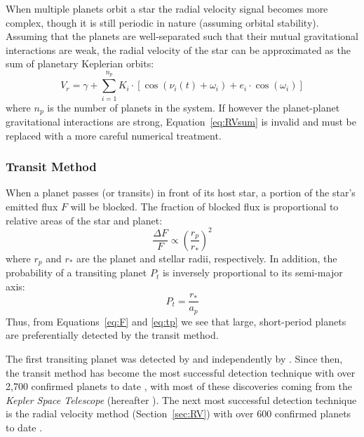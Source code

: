 When multiple planets orbit a star the radial velocity signal becomes more complex, though it is still periodic in nature (assuming orbital stability). 
Assuming that the planets are well-separated such that their mutual gravitational interactions are weak, the radial velocity of the star can be approximated as the sum of planetary Keplerian orbits:
\begin{equation}
V_r = \gamma + \sum_{i=1}^{n_p} K_i \cdot [\cos(\nu_i(t) + \omega_i) + e_i\cdot \cos(\omega_i)]
\label{eq:RVsum}
\end{equation}
where $n_p$ is the number of planets in the system. 
If however the planet-planet gravitational interactions are strong, Equation~\ref{eq:RVsum} is invalid and must be replaced with a more careful numerical treatment. 

\subsubsection{Transit Method}
\label{sec:transit}
When a planet passes (or transits) in front of its host star, a portion of the star's emitted flux $F$ will be blocked. 
The fraction of blocked flux is proportional to relative areas of the star and planet:
\begin{equation}
\frac{\Delta F}{F} \propto \left(\frac{r_p}{r_*}\right)^2
\label{eq:F}
\end{equation}
where $r_p$ and $r_*$ are the planet and stellar radii, respectively. 
In addition, the probability of a transiting planet $P_t$ is inversely proportional to its semi-major axis:
\begin{equation}
P_t = \frac{r_*}{a_p}
\label{eq:tp}
\end{equation}
Thus, from Equations~\ref{eq:F} and \ref{eq:tp} we see that large, short-period planets are preferentially detected by the transit method.

The first transiting planet was detected by \citet{Henry1999} and independently by \citet{Charbonneau2000}.
Since then, the transit method has become the most successful detection technique with over 2,700 confirmed planets to date \citep{NASAEA}, with most of these discoveries coming from the \textit{Kepler Space Telescope} (hereafter \kep).
The next most successful detection technique is the radial velocity method (Section~\ref{sec:RV}) with over 600 confirmed planets to date \citep{NASAEA}.


